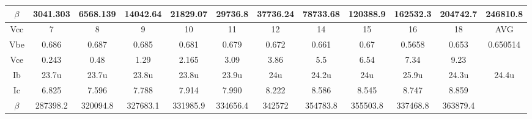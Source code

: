 \begin{table}[h]
{\begin{tabular}{|cccccccccccc|}
\multicolumn{1}{|c|}{$\beta$} & \multicolumn{1}{c|}{3041.303} & \multicolumn{1}{c|}{6568.139} & \multicolumn{1}{c|}{14042.64} & \multicolumn{1}{c|}{21829.07} & \multicolumn{1}{c|}{29736.8}  & \multicolumn{1}{c|}{37736.24} & \multicolumn{1}{c|}{78733.68} & \multicolumn{1}{c|}{120388.9} & \multicolumn{1}{c|}{162532.3} & \multicolumn{1}{c|}{204742.7} & 246810.8 \\ \hline
\multicolumn{1}{|c|}{Vcc}     & \multicolumn{1}{c|}{7}        & \multicolumn{1}{c|}{8}        & \multicolumn{1}{c|}{9}        & \multicolumn{1}{c|}{10}       & \multicolumn{1}{c|}{11}       & \multicolumn{1}{c|}{12}       & \multicolumn{1}{c|}{14}       & \multicolumn{1}{c|}{15}       & \multicolumn{1}{c|}{16}       & \multicolumn{1}{c|}{18}       & AVG      \\ \hline
\multicolumn{1}{|c|}{Vbe}     & \multicolumn{1}{c|}{0.686}    & \multicolumn{1}{c|}{0.687}    & \multicolumn{1}{c|}{0.685}    & \multicolumn{1}{c|}{0.681}    & \multicolumn{1}{c|}{0.679}    & \multicolumn{1}{c|}{0.672}    & \multicolumn{1}{c|}{0.661}    & \multicolumn{1}{c|}{0.67}     & \multicolumn{1}{c|}{0.5658}   & \multicolumn{1}{c|}{0.653}    & 0.650514 \\ \hline
\multicolumn{1}{|c|}{Vce}     & \multicolumn{1}{c|}{0.243}    & \multicolumn{1}{c|}{0.48}     & \multicolumn{1}{c|}{1.29}     & \multicolumn{1}{c|}{2.165}    & \multicolumn{1}{c|}{3.09}     & \multicolumn{1}{c|}{3.86}     & \multicolumn{1}{c|}{5.5}      & \multicolumn{1}{c|}{6.54}     & \multicolumn{1}{c|}{7.34}     & \multicolumn{1}{c|}{9.23}     &          \\ \hline
\multicolumn{1}{|c|}{Ib}      & \multicolumn{1}{c|}{23.7u}    & \multicolumn{1}{c|}{23.7u}    & \multicolumn{1}{c|}{23.8u}    & \multicolumn{1}{c|}{23.8u}    & \multicolumn{1}{c|}{23.9u}    & \multicolumn{1}{c|}{24u}      & \multicolumn{1}{c|}{24.2u}    & \multicolumn{1}{c|}{24u}      & \multicolumn{1}{c|}{25.9u}    & \multicolumn{1}{c|}{24.3u}    & 24.4u    \\ \hline
\multicolumn{1}{|c|}{Ic}      & \multicolumn{1}{c|}{6.825}    & \multicolumn{1}{c|}{7.596}    & \multicolumn{1}{c|}{7.788}    & \multicolumn{1}{c|}{7.914}    & \multicolumn{1}{c|}{7.990}    & \multicolumn{1}{c|}{8.222}    & \multicolumn{1}{c|}{8.586}    & \multicolumn{1}{c|}{8.545}    & \multicolumn{1}{c|}{8.747}    & \multicolumn{1}{c|}{8.859}    &          \\ \hline
\multicolumn{1}{|c|}{$\beta$} & \multicolumn{1}{c|}{287398.2} & \multicolumn{1}{c|}{320094.8} & \multicolumn{1}{c|}{327683.1} & \multicolumn{1}{c|}{331985.9} & \multicolumn{1}{c|}{334656.4} & \multicolumn{1}{c|}{342572}   & \multicolumn{1}{c|}{354783.8} & \multicolumn{1}{c|}{355503.8} & \multicolumn{1}{c|}{337468.8} & \multicolumn{1}{c|}{363879.4} &          \\ \hline
\end{tabular}
}
\end{table}
